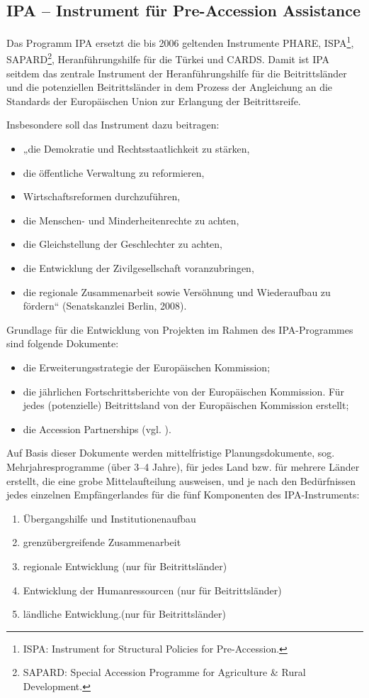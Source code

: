 \subsection{IPA – Instrument für Pre-Accession Assistance}
Das Programm IPA ersetzt die bis 2006 geltenden Instrumente PHARE, ISPA\footnote{ISPA: Instrument for Structural Policies for Pre-Accession.}, SAPARD\footnote{SAPARD: Special Accession Programme for Agriculture \& Rural Development.}, Heranführungshilfe für die Türkei und CARDS. Damit ist IPA seitdem das zentrale Instrument der Heranführungshilfe für die Beitrittsländer und die potenziellen Beitrittsländer in dem Prozess der Angleichung an die Standards der Europäischen Union zur Erlangung der Beitrittsreife.\par

Insbesondere soll das Instrument dazu beitragen:
\begin{itemize}
\item „die Demokratie und Rechtsstaatlichkeit zu stärken,
\item die öffentliche Verwaltung zu reformieren,
\item Wirtschaftsreformen durchzuführen,
\item die Menschen- und Minderheitenrechte zu achten,
\item die Gleichstellung der Geschlechter zu achten,
\item die Entwicklung der Zivilgesellschaft voranzubringen,
\item die regionale Zusammenarbeit sowie Versöhnung und Wiederaufbau zu fördern“ (Senatskanzlei Berlin, 2008). 
\end{itemize}
Grundlage für die Entwicklung von Projekten im Rahmen des IPA-Programmes sind folgende Dokumente:
\begin{itemize}
\item die Erweiterungsstrategie der Europäischen Kommission;
\item die jährlichen Fortschrittsberichte von der Europäischen Kommission. Für jedes (potenzielle) Beitrittsland von der Europäischen Kommission erstellt;
\item die Accession Partnerships (vgl. \cite{eurcom11a}).
\end{itemize}
Auf Basis dieser Dokumente werden mittelfristige Planungsdokumente, sog. Mehrjahresprogramme (über 3–4 Jahre), für jedes Land bzw. für mehrere Länder erstellt, die eine grobe Mittelaufteilung ausweisen, und je nach den Bedürfnissen jedes einzelnen Empfängerlandes für die fünf Komponenten des IPA-Instruments:
\begin{enumerate}[label=IPA {\roman*}:,align=left,  leftmargin=*]
\item Übergangshilfe und Institutionenaufbau
\item  grenzübergreifende Zusammenarbeit
\item regionale Entwicklung (nur für Beitrittsländer)
\item Entwicklung der Humanressourcen (nur für Beitrittsländer)
\item ländliche Entwicklung.(nur für Beitrittsländer)
\end{enumerate}
